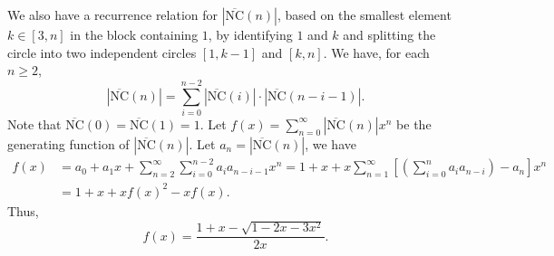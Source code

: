 We also have a recurrence relation for $|\overline{\text{NC}}(n)|$, based on the smallest element $k\in [3,n]$ in the block containing $1$, by identifying $1$ and $k$ and splitting the circle into two independent circles $[1,k-1]$ and $[k,n]$. We have, for each $n\ge 2$,
$$|\overline{\text{NC}}(n)| = \sum_{i=0}^{n-2} |\overline{\text{NC}}(i)| \cdot |\overline{\text{NC}}(n-i-1)|.$$
Note that $\overline{\text{NC}}(0) = \overline{\text{NC}}(1) = 1$. Let $f(x) = \sum_{n=0}^{\infty} |\overline{\text{NC}}(n)|x^n$ be the generating function of $|\overline{\text{NC}}(n)|$. Let $a_n=|\overline{\text{NC}}(n)|$, we have
\begin{align*}
  f(x) & = a_0 + a_1 x  + \sum_{n=2}^{\infty} \sum_{i=0}^{n-2} a_i a_{n-i-1} x^n = 1 + x + x \sum_{n=1}^{\infty} \left[ \left( \sum_{i=0}^{n} a_i a_{n-i} \right) - a_n \right] x^n \\
       & = 1 + x + x f(x)^2 - x f(x).
\end{align*}
Thus,
$$f(x) = \frac{1+x-\sqrt{1-2x-3x^2}}{2x}.$$
